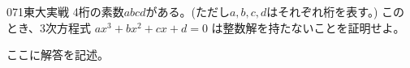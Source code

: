 \begin{prob}{071}{}{東大実戦}
 4桁の素数$abcd$がある。(ただし$a, b, c, d$はそれぞれ桁を表す。) このとき、3次方程式 $ax^3+bx^2+cx+d=0$ は整数解を持たないことを証明せよ。
\end{prob}
ここに解答を記述。